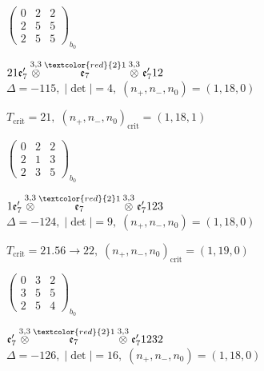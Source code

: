 \documentclass[10pt]{article}
\begin{document}
\hspace{2em}$\left(\begin{smallmatrix}0 & 2 & 2 \\ 2 & 5 & 5 \\ 2 & 5 & 5\end{smallmatrix}\right)_{\!b_0}$

\smallskip

$21\mathfrak{e}_7'\overset{3,3}{\otimes}\overset{\textcolor{red}{2}1}{\mathfrak{e}_7}\overset{3,3}{\otimes}\mathfrak{e}_7'12$ \quad $\Delta=-115,\; |\det|=4,\; (n_+,n_-,n_0)=(1,18,0)$

\hspace{1em}$T_{\text{crit}}=21,\; (n_+,n_-,n_0)_{\text{crit}}=(1,18,1)$

\hspace{2em}$\left(\begin{smallmatrix}0 & 2 & 2 \\ 2 & 1 & 3 \\ 2 & 3 & 5\end{smallmatrix}\right)_{\!b_0}$

\smallskip

$1\mathfrak{e}_7'\overset{3,3}{\otimes}\overset{\textcolor{red}{2}1}{\mathfrak{e}_7}\overset{3,3}{\otimes}\mathfrak{e}_7'123$ \quad $\Delta=-124,\; |\det|=9,\; (n_+,n_-,n_0)=(1,18,0)$

\hspace{1em}$T_{\text{crit}}=21.56 \to 22,\; (n_+,n_-,n_0)_{\text{crit}}=(1,19,0)$

\hspace{2em}$\left(\begin{smallmatrix}0 & 3 & 2 \\ 3 & 5 & 5 \\ 2 & 5 & 4\end{smallmatrix}\right)_{\!b_0}$

\smallskip

$\mathfrak{e}_7'\overset{3,3}{\otimes}\overset{\textcolor{red}{2}1}{\mathfrak{e}_7}\overset{3,3}{\otimes}\mathfrak{e}_7'1232$ \quad $\Delta=-126,\; |\det|=16,\; (n_+,n_-,n_0)=(1,18,0)$
\end{document}
